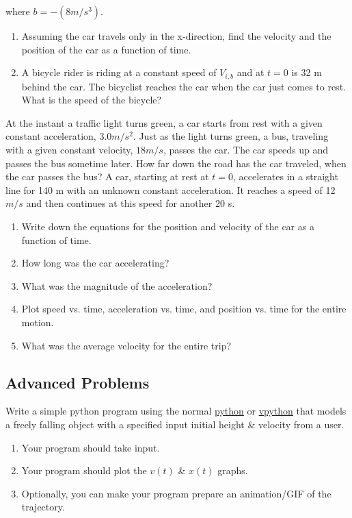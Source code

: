 \documentclass[12pt,addpoints]{exam}
\begin{document}
\begin{questions}
		where $b = -(8 m/s^3)$.
		\begin{enumerate}[label*=(\Alph*)]
			\item Assuming the car travels only in the x-direction, find the velocity and the position of the car as a function of time.
			\item A bicycle rider is riding at a constant speed of  $V_{i,b}$
			and at $t = 0$ is 32 m behind the car. The bicyclist reaches the car when the car just comes to rest. What is the speed of the bicycle?
		\end{enumerate}
		\question[15] At the instant a traffic light turns green, a car starts from rest with a given constant acceleration, $3.0m/s^{2}$. Just as the light turns green, a bus, traveling with a given constant velocity,  $18m/s$, passes the car. The car speeds up and passes the bus sometime later. How far down the road has the car traveled, when the car passes the bus?
		\question[15] A car, starting at rest at  $t=0$, accelerates in a straight line for 140 m with an unknown constant acceleration. It reaches a speed of 12 $m/s$ and then continues at this speed for another 20 s.
		\begin{enumerate}[label*=(\Alph*)]
			\item Write down the equations for the position and velocity of the car as a function of time.
			\item How long was the car accelerating?
			\item What was the magnitude of the acceleration?
			\item Plot speed vs. time, acceleration vs. time, and position vs. time for the entire motion.
			\item What was the average velocity for the entire trip?
		\end{enumerate}
		\subsection*{Advanced Problems}
		\question[10] Write a simple python program using the normal \href{https://python.org}{python} or \href{https://vpython.org/}{vpython} that models a freely falling object with a specified input initial height \& velocity from a user.
		\begin{enumerate}[label*=(\alph*)]
			\item Your program should take input.
			\item Your program should plot the $v(t)$ \& $x(t)$ graphs.
			\item Optionally, you can make your program prepare an animation/GIF of the trajectory. 
		\end{enumerate}
	\end{questions}
\end{document}
